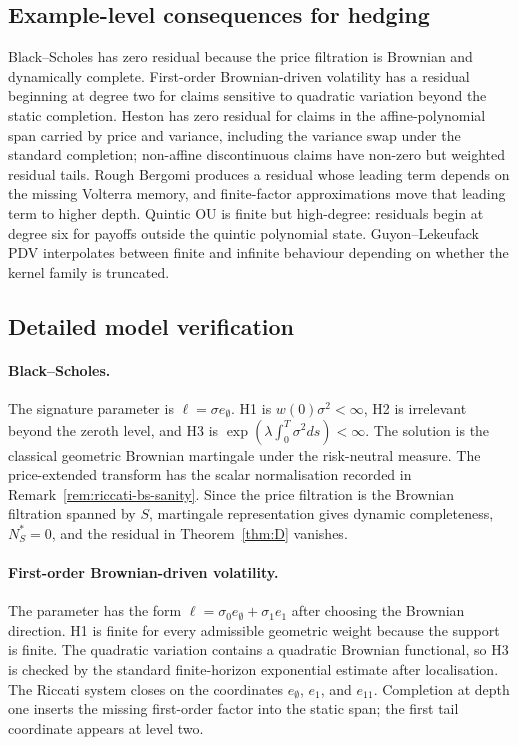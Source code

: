 \documentclass[11pt,oneside]{article}
\theoremstyle{plain}
\theoremstyle{definition}
\theoremstyle{remark}
\begin{document}
\subsection{Example-level consequences for hedging}
Black--Scholes has zero residual because the price filtration is Brownian and dynamically complete. First-order Brownian-driven volatility has a residual beginning at degree two for claims sensitive to quadratic variation beyond the static completion. Heston has zero residual for claims in the affine-polynomial span carried by price and variance, including the variance swap under the standard completion; non-affine discontinuous claims have non-zero but weighted residual tails. Rough Bergomi produces a residual whose leading term depends on the missing Volterra memory, and finite-factor approximations move that leading term to higher depth. Quintic OU is finite but high-degree: residuals begin at degree six for payoffs outside the quintic polynomial state. Guyon--Lekeufack PDV interpolates between finite and infinite behaviour depending on whether the kernel family is truncated.


\subsection{Detailed model verification}
\label{subsec:detailed-model-verification}
\paragraph{Black--Scholes.}
The signature parameter is $\ell=\sigma e_\emptyset$. H1 is $w(0)\sigma^2<\infty$, H2 is irrelevant beyond the zeroth level, and H3 is $\exp(\lambda\int_0^T\sigma^2ds)<\infty$. The solution is the classical geometric Brownian martingale under the risk-neutral measure. The price-extended transform has the scalar normalisation recorded in Remark~\ref{rem:riccati-bs-sanity}. Since the price filtration is the Brownian filtration spanned by $S$, martingale representation gives dynamic completeness, $N_S^\ast=0$, and the residual in Theorem~\ref{thm:D} vanishes.

\paragraph{First-order Brownian-driven volatility.}
The parameter has the form $\ell=\sigma_0e_\emptyset+\sigma_1e_1$ after choosing the Brownian direction. H1 is finite for every admissible geometric weight because the support is finite. The quadratic variation contains a quadratic Brownian functional, so H3 is checked by the standard finite-horizon exponential estimate after localisation. The Riccati system closes on the coordinates $e_\emptyset$, $e_1$, and $e_{11}$. Completion at depth one inserts the missing first-order factor into the static span; the first tail coordinate appears at level two.
\end{document}
